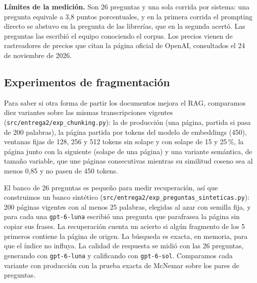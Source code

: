 \documentclass[11pt,letterpaper]{article}
\newcommand{\cod}[1]{\texttt{\small #1}}
\begin{document}
\textbf{Límites de la medición.} Son 26 preguntas y una sola corrida por sistema: una pregunta equivale a 3,8 puntos porcentuales, y en la primera corrida el prompting directo se abstuvo en la pregunta de las librerías, que en la segunda acertó. Las preguntas las escribió el equipo conociendo el corpus. Los precios vienen de rastreadores de precios que citan la página oficial de OpenAI, consultados el 24 de noviembre de 2026.

\subsection{Experimentos de fragmentación}
\label{sec:chunking}

Para saber si otra forma de partir los documentos mejora el RAG, comparamos diez variantes sobre las mismas transcripciones vigentes (\cod{src/entrega2/exp\_chunking.py}): la de producción (una página, partida si pasa de 200 palabras), la página partida por tokens del modelo de embeddings (450), ventanas fijas de 128, 256 y 512 tokens sin solape y con solape de 15 y 25\,\%, la página junto con la siguiente (solape de una página) y una variante semántica, de tamaño variable, que une páginas consecutivas mientras su similitud coseno sea al menos 0,85 y no pasen de 450 tokens.

El banco de 26 preguntas es pequeño para medir recuperación, así que construimos un banco sintético (\cod{src/entrega2/exp\_preguntas\_sinteticas.py}): 200 páginas vigentes con al menos 25 palabras, elegidas al azar con semilla fija, y para cada una \cod{gpt-6-luna} escribió una pregunta que parafrasea la página sin copiar sus frases. La recuperación cuenta un acierto si algún fragmento de los 5 primeros contiene la página de origen. La búsqueda es exacta, en memoria, para que el índice no influya. La calidad de respuesta se midió con las 26 preguntas, generando con \cod{gpt-6-luna} y calificando con \cod{gpt-6-sol}. Comparamos cada variante con producción con la prueba exacta de McNemar sobre los pares de preguntas.
\end{document}
